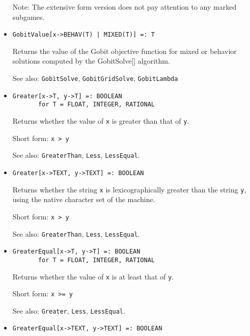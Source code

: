 \begin{itemize}
\item
[Note:] The extensive form version does not pay attention to any marked
subgames.
\ed

\item
\protect \large \begin{verbatim}
GobitValue[x->BEHAV(T) | MIXED(T)] =: T
\end{verbatim}\normalsize

\bd
Returns the value of the Gobit objective function for mixed or behavior solutions
computed by the GobitSolve[] algorithm. 
\item
[See also:] {\tt GobitSolve}, {\tt GobitGridSolve}, {\tt GobitLambda}
\ed

\item
\protect \large \begin{verbatim}
Greater[x->T, y->T] =: BOOLEAN
       for T = FLOAT, INTEGER, RATIONAL
\end{verbatim}\normalsize

\bd
Returns whether the value of \verb+x+ is greater than
that of \verb+y+.
\item
[Short form:] \verb+x > y+
\item
[See also:] {\tt GreaterThan}, {\tt Less}, {\tt LessEqual}.
\ed

\item
\protect \large \begin{verbatim}
Greater[x->TEXT, y->TEXT] =: BOOLEAN
\end{verbatim}\normalsize

\bd
Returns whether the string \verb+x+ is lexicographically greater than
the string \verb+y+, using the native character set of the machine.
\item
[Short form:] \verb+x > y+
\item
[See also:] {\tt GreaterThan}, {\tt Less}, {\tt LessEqual}.
\ed

\item
\protect \large \begin{verbatim}
GreaterEqual[x->T, y->T] =: BOOLEAN
       for T = FLOAT, INTEGER, RATIONAL
\end{verbatim}\normalsize

\bd
Returns whether the value of \verb+x+ is at least that of
\verb+y+.
\item
[Short form:] \verb+x >= y+
\item
[See also:] {\tt Greater}, {\tt Less}, {\tt LessEqual}.
\ed

\item
\protect \large \begin{verbatim}
GreaterEqual[x->TEXT, y->TEXT] =: BOOLEAN
\end{verbatim}\normalsize


\end{itemize}
